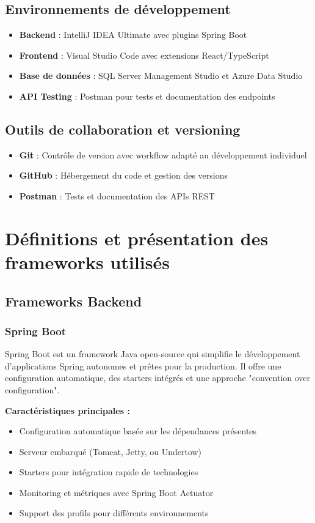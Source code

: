 \documentclass[12pt,a4paper]{report}
\begin{document}
\subsection{Environnements de développement}
\begin{itemize}
\item \textbf{Backend} : IntelliJ IDEA Ultimate avec plugins Spring Boot
\item \textbf{Frontend} : Visual Studio Code avec extensions React/TypeScript
\item \textbf{Base de données} : SQL Server Management Studio et Azure Data Studio
\item \textbf{API Testing} : Postman pour tests et documentation des endpoints
\end{itemize}

\subsection{Outils de collaboration et versioning}
\begin{itemize}
\item \textbf{Git} : Contrôle de version avec workflow adapté au développement individuel
\item \textbf{GitHub} : Hébergement du code et gestion des versions
\item \textbf{Postman} : Tests et documentation des APIs REST
\end{itemize}


\section{Définitions et présentation des frameworks utilisés}

\subsection{Frameworks Backend}

\subsubsection{Spring Boot}
Spring Boot est un framework Java open-source qui simplifie le développement d'applications Spring autonomes et prêtes pour la production. Il offre une configuration automatique, des starters intégrés et une approche "convention over configuration".

\textbf{Caractéristiques principales :}
\begin{itemize}
\item Configuration automatique basée sur les dépendances présentes
\item Serveur embarqué (Tomcat, Jetty, ou Undertow)
\item Starters pour intégration rapide de technologies
\item Monitoring et métriques avec Spring Boot Actuator
\item Support des profils pour différents environnements
\end{itemize}
\end{document}
